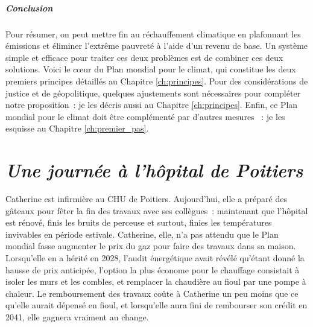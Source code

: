 \documentclass[a5paper,french,openany]{memoir}
\begin{document}

\paragraph{Conclusion}
Pour résumer, on peut mettre fin au réchauffement climatique en plafonnant les émissions et éliminer l'extrême pauvreté à l'aide d'un revenu de base. Un système simple et efficace pour traiter ces deux problèmes est de combiner ces deux solutions. Voici le cœur du Plan mondial pour le climat, %
qui constitue les deux premiers principes détaillés au Chapitre \ref{ch:principes}. Pour des considérations de justice et de géopolitique, quelques ajustements sont nécessaires pour compléter notre proposition~: je les décris aussi au Chapitre \ref{ch:principes}. %
Enfin, ce Plan mondial pour le climat doit être complémenté par d'autres mesures%
~: je les esquisse au Chapitre \ref{ch:premier_pas}.


\chapter*{\textit{Une journée à l'hôpital de Poitiers}}\label{ch:narr_poitiers}

Catherine est infirmière au CHU de Poitiers. Aujourd'hui, elle a préparé des gâteaux pour fêter la fin des travaux avec ses collègues~: maintenant que l'hôpital est rénové, finis les bruits de perceuse et surtout, finies les températures invivables en période estivale. Catherine, elle, n'a pas attendu que le Plan mondial fasse augmenter le prix du gaz pour faire des travaux dans sa maison. Lorsqu'elle en a hérité en 2028, l'audit énergétique avait révélé qu'étant donné la hausse de prix anticipée, l'option la plus économe pour le chauffage consistait à isoler les murs et les combles, et remplacer la chaudière au fioul par une pompe à chaleur. Le remboursement des travaux coûte à Catherine un peu moins que ce qu'elle aurait dépensé en fioul, et lorsqu'elle aura fini de rembourser son crédit en 2041, elle gagnera vraiment au change. 
\end{document}
